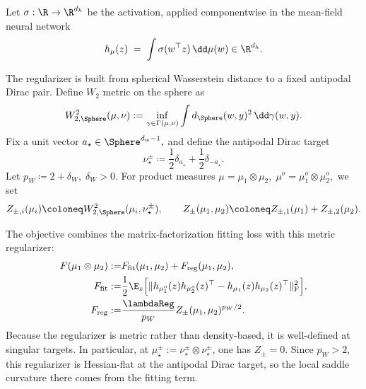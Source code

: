 Let \(\sigma:\R\to\R^{d_h}\) be the activation, applied componentwise in the mean-field neural network
\begin{equation}
    h_\mu(z)
    \;=\; \int \sigma(w^\top z)\,\dd \mu(w) \in \R^{d_h}.
\end{equation}

The regularizer is built from spherical Wasserstein distance to a fixed antipodal Dirac pair.
Define $W_2$ metric on the sphere as
\[
W_{2,\Sphere}^2(\mu,\nu)
:=
\inf_{\gamma\in\Gamma(\mu,\nu)}
\int d_\Sphere(w,y)^2\,\dd\gamma(w,y).
\]
Fix a unit vector $a_\star\in\Sphere^{d_w-1}, $
and define the antipodal Dirac target
\[
    \nu_\star^\pm
    \coloneq
    \frac12\delta_{a_\star}+\frac12\delta_{-a_\star}.
\]
Let $p_W\coloneq 2+\delta_W,
    \;
    \delta_W>0.$
For product measures $\mu=\mu_1\otimes\mu_2,\;
    \mu^o=\mu_1^o\otimes\mu_2^o,$
we set
\[
    Z_{\pm,i}(\mu_i)
    \coloneq
    W_{2,\Sphere}^2(\mu_i,\nu_\star^\pm),
    \qquad
    Z_\pm(\mu_1,
    \mu_2)
    \coloneq
    Z_{\pm,1}(\mu_1)+Z_{\pm,2}(\mu_2).
\]

The objective combines the matrix-factorization fitting loss with this metric regularizer:
\begin{align}
\label{eq:EMN-objective-squared-chi2}
F(\mu_1\otimes\mu_2)
:=&
F_{\mathrm{fit}}(\mu_1,\mu_2)
+
F_{\mathrm{reg}}(\mu_1,\mu_2),\\
F_{\mathrm{fit}}
:=&
\frac12\E_z\Bigl[
\|h_{\mu_1^o}(z)h_{\mu_2^o}(z)^\top
-h_{\mu_1}(z)h_{\mu_2}(z)^\top\|_{\mathrm F}^2
\Bigr],\\
F_{\mathrm{reg}}
:=&
\frac{\lambdaReg}{p_W}Z_\pm(\mu_1,\mu_2)^{p_W/2}.
\end{align}
Because the regularizer is metric rather than density-based, it is well-defined at singular targets. In particular, at
\(\mu_\star^\pm:=\nu_\star^\pm\otimes\nu_\star^\pm\), one has \(Z_\pm=0\). Since \(p_W>2\), this regularizer is Hessian-flat at the antipodal Dirac target, so the local saddle curvature there comes from the fitting term.

